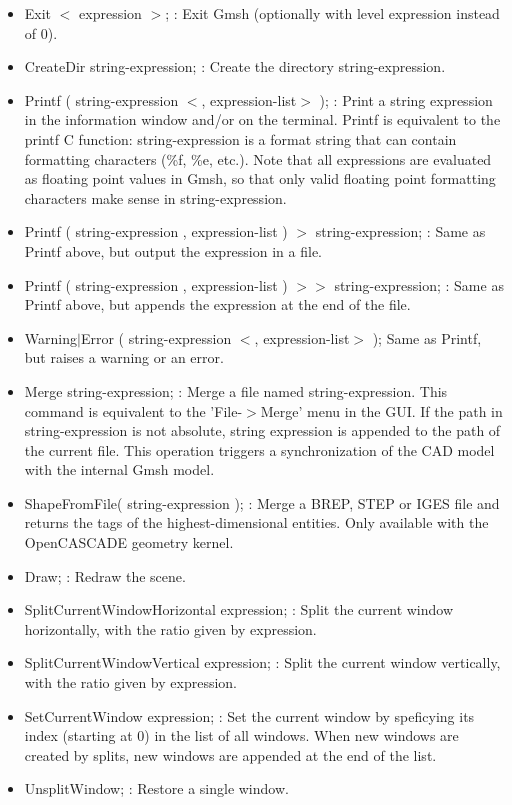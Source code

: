 \documentclass[dvipdfmx, 9pt, a4paper]{article}
\numberwithin{equation}{section}
\begin{document}
\begin{itemize}
\item Exit $<$ expression $>$; : Exit Gmsh (optionally with level expression instead of 0).
\item CreateDir string-expression; : Create the directory string-expression.
\item Printf ( string-expression $<$, expression-list$>$ ); : Print a string expression in the information window and/or on the terminal. Printf is equivalent to the printf C function: string-expression is a format string that can contain formatting characters (\%f, \%e, etc.). Note that all expressions are evaluated as floating point values in Gmsh, so that only valid floating point formatting characters make sense in string-expression.
\item Printf ( string-expression , expression-list ) $>$ string-expression; : Same as Printf above, but output the expression in a file.
\item Printf ( string-expression , expression-list ) $>>$ string-expression; : Same as Printf above, but appends the expression at the end of the file.
\item Warning$|$Error ( string-expression $<$, expression-list$>$ ); Same as Printf, but raises a warning or an error.
\item Merge string-expression; : Merge a file named string-expression. This command is equivalent to the 'File-$>$Merge' menu in the GUI. If the path in string-expression is not absolute, string expression is appended to the path of the current file. This operation triggers a synchronization of the CAD model with the internal Gmsh model.
\item ShapeFromFile( string-expression ); : Merge a BREP, STEP or IGES file and returns the tags of the highest-dimensional entities. Only available with the OpenCASCADE geometry kernel.
\item Draw; : Redraw the scene.
\item SplitCurrentWindowHorizontal expression; : Split the current window horizontally, with the ratio given by expression.
\item SplitCurrentWindowVertical expression; : Split the current window vertically, with the ratio given by expression.
\item SetCurrentWindow expression; : Set the current window by speficying its index (starting at 0) in the list of all windows. When new windows are created by splits, new windows are appended at the end of the list.
\item UnsplitWindow; : Restore a single window.

\end{itemize}
\end{document}
